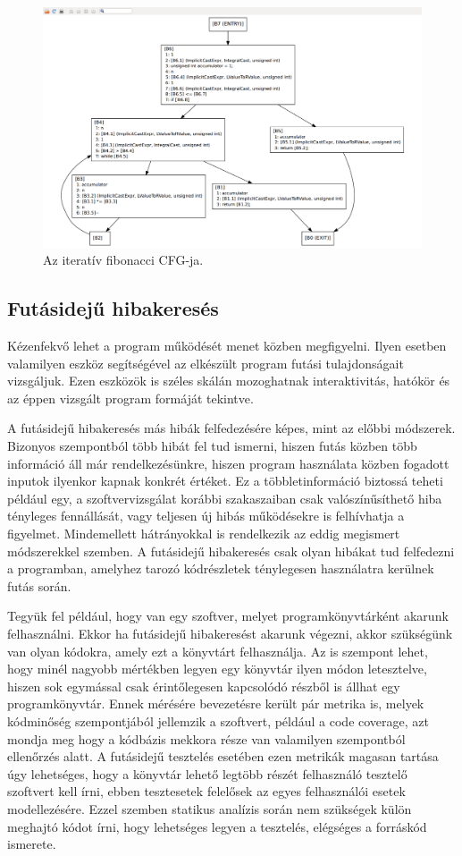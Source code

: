 \documentclass[a4paper,12pt]{report}
\begin{document}
\begin{figure}[h]
\caption{Az iteratív fibonacci CFG-ja.}
\centering
\includegraphics[scale=0.2]{fibiter_cfg.png}
\end{figure}

\subsection{Futásidejű hibakeresés}
Kézenfekvő lehet a program működését menet közben megfigyelni. Ilyen esetben valamilyen eszköz segítségével az elkészült program futási tulajdonságait vizsgáljuk. Ezen eszközök is széles skálán mozoghatnak interaktivitás, hatókör és az éppen vizsgált program formáját tekintve.

A futásidejű hibakeresés más hibák felfedezésére képes, mint az előbbi módszerek. Bizonyos szempontból több hibát fel tud ismerni, hiszen futás közben több információ áll már rendelkezésünkre, hiszen program használata közben fogadott inputok ilyenkor kapnak konkrét értéket. Ez a többletinformáció biztossá teheti például egy, a szoftvervizsgálat korábbi szakaszaiban csak valószínűsíthető hiba tényleges fennállását, vagy teljesen új hibás működésekre is felhívhatja a figyelmet. Mindemellett hátrányokkal is rendelkezik az eddig megismert módszerekkel szemben. A futásidejű hibakeresés csak olyan hibákat tud felfedezni a programban, amelyhez tarozó kódrészletek ténylegesen használatra kerülnek futás során.

Tegyük fel például, hogy van egy szoftver, melyet programkönyvtárként akarunk felhasználni. Ekkor ha futásidejű hibakeresést akarunk végezni, akkor szükségünk van olyan kódokra, amely ezt a könyvtárt felhasználja. Az is szempont lehet, hogy minél nagyobb mértékben legyen egy könyvtár ilyen módon letesztelve, hiszen sok egymással csak érintőlegesen kapcsolódó részből is állhat egy programkönyvtár. Ennek mérésére bevezetésre került pár metrika is, melyek kódminőség szempontjából jellemzik a szoftvert, például a code coverage, azt mondja meg hogy a kódbázis mekkora része van valamilyen szempontból ellenőrzés alatt. A futásidejű tesztelés esetében ezen metrikák magasan tartása úgy lehetséges, hogy a könyvtár lehető legtöbb részét felhasználó tesztelő szoftvert kell írni, ebben tesztesetek felelősek az egyes felhasználói esetek modellezésére. Ezzel szemben statikus analízis során nem szükségek külön meghajtó kódot írni, hogy lehetséges legyen a tesztelés, elégséges a forráskód ismerete.
\end{document}
